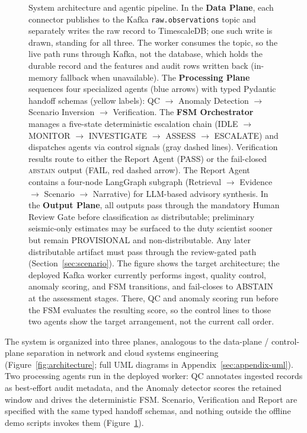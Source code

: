 \documentclass{article}
\begin{document}
\begin{figure}[t]
\caption{System architecture and agentic pipeline. In the
  \textbf{Data Plane}, each connector publishes to the Kafka
  \texttt{raw.observations} topic and separately writes the raw record to
  TimescaleDB; one such write is drawn, standing for all three.  The worker consumes the topic, so the live path runs
  through Kafka, not the database, which holds the durable record and the
  features and audit rows written back (in-memory fallback when
  unavailable).
  The \textbf{Processing Plane} sequences four specialized agents (blue
  arrows) with typed Pydantic handoff schemas (yellow labels):
  QC $\to$ Anomaly Detection $\to$ Scenario Inversion $\to$ Verification.
  The \textbf{FSM Orchestrator} manages a five-state deterministic
  escalation chain (IDLE $\to$ MONITOR $\to$ INVESTIGATE $\to$ ASSESS
  $\to$ ESCALATE) and dispatches agents via control signals (gray dashed
  lines). Verification results route to either the Report Agent (PASS)
  or the fail-closed \textsc{abstain} output (FAIL, red dashed arrow).
  The Report Agent contains a four-node LangGraph subgraph
  (Retrieval $\to$ Evidence $\to$ Scenario $\to$ Narrative)
  for LLM-based advisory synthesis. In the \textbf{Output Plane}, all
  outputs pass through the mandatory Human Review Gate before
  classification as distributable; preliminary seismic-only estimates
  may be surfaced to the duty scientist sooner but remain PROVISIONAL
  and non-distributable. Any later distributable artifact must pass
  through the review-gated path (Section~\ref{sec:scenario}). The figure shows the
  target architecture; the deployed Kafka worker currently performs
  ingest, quality control, anomaly scoring, and FSM transitions, and
  fail-closes to ABSTAIN at the assessment stages.  There, QC and anomaly
  scoring run before the FSM evaluates the resulting score, so the control
  lines to those two agents show the target arrangement, not the current
  call order.}
\label{fig:architecture}%
\label{fig:pipeline}%
\end{figure}

The system is organized into three planes, analogous to the
data-plane / control-plane separation in network and cloud systems
engineering (Figure~\ref{fig:architecture};
full UML diagrams in Appendix~\ref{sec:appendix-uml}).
Two processing agents run in the deployed worker: QC annotates
ingested records as best-effort audit metadata, and the Anomaly
detector scores the retained window and drives the deterministic FSM.  Scenario, Verification and Report are
specified with the same typed handoff schemas, and nothing outside the
offline demo scripts invokes them (Figure~\ref{fig:pipeline}).
\end{document}
